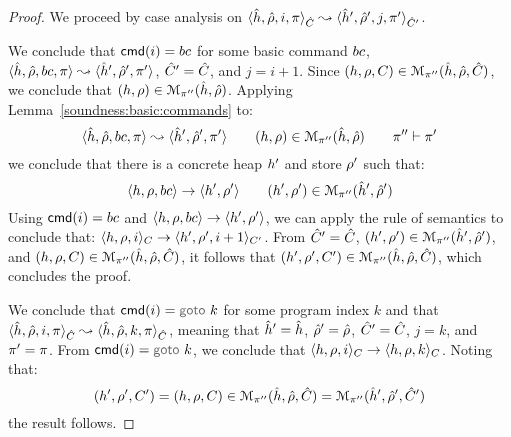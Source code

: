 \begin{proof}
We proceed by case analysis on $\symbtrans{\sheap, \sstore, i, \pc}{\sheap', \sstore', j, \pc'}[\sctx][\sctx']$. 
\vspace{5pt}

\noindent{} 
We conclude that $\ccmd{i} = \bcmd$ for some basic command $\bcmd$,  
$\symbtrans{\sheap, \sstore, \bcmd, \pc}{\sheap', \sstore', \pc'}$, 
$\sctx' = \sctx$, and $j = i + 1$. 
Since $(\heap, \store, \ctx) \in \smodels{\sheap, \sstore, \sctx}{\pc''}$, we conclude 
that $(\heap, \store) \in \smodels{\sheap, \sstore}{\pc''}$. 
Applying Lemma~\ref{soundness:basic:commands} to: 
$$ 
\symbtrans{\sheap, \sstore, \bcmd, \pc}{\sheap', \sstore', \pc'} 
\qquad 
(\heap, \store) \in \smodels{\sheap, \sstore}{\pc''}
\qquad 
\pc'' \vdash \pc'
$$
we conclude that there is a concrete heap $\heap'$ and store $\store'$ such 
that: 
$$
\semtrans{\heap, \store, \bcmd}{\heap', \store'}
\qquad 
(\heap', \store') \in \smodels{\sheap', \sstore'}{\pc''}  
$$
Using $\ccmd{i} = \bcmd$ and $\semtrans{\heap, \store, \bcmd}{\heap', \store'}$, 
we can apply the  rule of \jsil semantics to conclude 
that: $\semtrans{\heap, \store, i}{\heap', \store', i+1}[\ctx][\ctx']$. 
From $\sctx' = \sctx$, $(\heap', \store') \in \smodels{\sheap', \sstore'}{\pc''}$, 
and $(\heap, \store, \ctx) \in \smodels{\sheap, \sstore, \sctx}{\pc''}$, it follows
that $(\heap', \store', \ctx') \in \smodels{\sheap, \sstore, \sctx}{\pc''}$, 
which concludes the proof. 
\vspace{6pt}


\noindent{} 
We conclude that $\ccmd{i} = \goto \, k$ for some program index $k$ and 
that $\symbtrans{\sheap, \sstore, i, \pc}{\sheap, \sstore, k, \pc}[\sctx][\sctx]$, 
meaning that $\sheap' = \sheap$, $\sstore' = \sstore$, $\sctx' = \sctx$, $j = k$, 
and $\pc' = \pc$. 
From $\ccmd{i} = \goto \, k$, we conclude that 
$\semtrans{\heap, \store, i}{\heap, \store, k}[\ctx][\ctx]$. 
Noting that: 
$$
(\heap', \store', \ctx') = (\heap, \store, \ctx) \in \smodels{\sheap, \sstore, \sctx}{\pc''}  = \smodels{\sheap', \sstore', \sctx'}{\pc''}
$$
the result follows. 
\vspace{6pt}



\end{proof}
